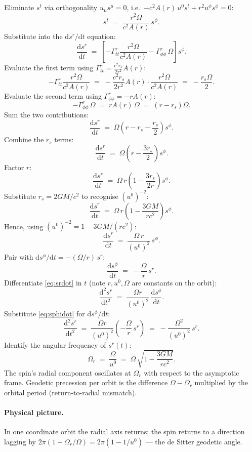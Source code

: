 \documentclass[11pt]{article}
\newcommand{\de}{\mathrm{d}}
\begin{document}
Eliminate $s^t$ via orthogonality $u_\mu s^\mu = 0$, i.e.\ $-c^2 A(r)\,u^0 s^t + r^2 u^\phi s^\phi = 0$:
\[
s^t \;=\; \frac{r^2\Omega}{c^2 A(r)}\,s^\phi.
\]
Substitute into the $\de s^r/\de t$ equation:
\[
\frac{\de s^r}{\de t} \;=\; \!\left[-\Gamma^{r}_{tt}\frac{r^2\Omega}{c^2 A(r)} - \Gamma^{r}_{\phi\phi}\,\Omega\right] s^\phi.
\]
Evaluate the first term using $\Gamma^r_{tt}=\tfrac{c^2 r_s}{2r^2}A(r)$:
\[
-\Gamma^{r}_{tt}\frac{r^2\Omega}{c^2 A(r)} \;=\; -\frac{c^2 r_s}{2 r^2}A(r)\cdot\frac{r^2\Omega}{c^2 A(r)} \;=\; -\frac{r_s\Omega}{2}.
\]
Evaluate the second term using $\Gamma^r_{\phi\phi}=-r A(r)$:
\[
-\Gamma^{r}_{\phi\phi}\,\Omega \;=\; r A(r)\,\Omega \;=\; (r-r_s)\Omega.
\]
Sum the two contributions:
\[
\frac{\de s^r}{\de t} \;=\; \Omega\!\left(r - r_s - \frac{r_s}{2}\right) s^\phi.
\]
Combine the $r_s$ terms:
\[
\frac{\de s^r}{\de t} \;=\; \Omega\!\left(r - \frac{3r_s}{2}\right) s^\phi.
\]
Factor $r$:
\[
\frac{\de s^r}{\de t} \;=\; \Omega\,r\!\left(1 - \frac{3 r_s}{2 r}\right) s^\phi.
\]
Substitute $r_s=2GM/c^2$ to recognise $(u^0)^{-2}$:
\[
\frac{\de s^r}{\de t} \;=\; \Omega\,r\!\left(1 - \frac{3GM}{rc^2}\right) s^\phi.
\]
Hence, using $(u^0)^{-2}=1-3GM/(rc^2)$:
\begin{equation}
\frac{\de s^r}{\de t} \;=\; \frac{\Omega\,r}{(u^0)^2}\,s^\phi.
\label{eq:srdot}
\end{equation}
Pair with $\de s^\phi/\de t = -(\Omega/r)\,s^r$:
\begin{equation}
\frac{\de s^\phi}{\de t} \;=\; -\frac{\Omega}{r}\,s^r.
\label{eq:sphidot}
\end{equation}
Differentiate \eqref{eq:srdot} in $t$ (note $r,u^0,\Omega$ are constants on the orbit):
\[
\frac{\de^2 s^r}{\de t^2} \;=\; \frac{\Omega r}{(u^0)^2}\,\frac{\de s^\phi}{\de t}.
\]
Substitute \eqref{eq:sphidot} for $\de s^\phi/\de t$:
\[
\frac{\de^2 s^r}{\de t^2} \;=\; \frac{\Omega r}{(u^0)^2}\!\left(-\frac{\Omega}{r}\,s^r\right) \;=\; -\frac{\Omega^2}{(u^0)^2}\,s^r.
\]
Identify the angular frequency of $s^r(t)$:
\begin{equation}
\boxed{\;\Omega_r \;=\; \frac{\Omega}{u^0} \;=\; \Omega\,\sqrt{1-\frac{3GM}{rc^2}}.\;}
\label{eq:Or}
\end{equation}
The spin's radial component oscillates at $\Omega_r$ with respect to the asymptotic frame. Geodetic precession per orbit is the difference $\Omega-\Omega_r$ multiplied by the orbital period (return-to-radial mismatch).

\paragraph{Physical picture.}
In one coordinate orbit the radial axis returns; the spin returns to a direction lagging by $2\pi(1-\Omega_r/\Omega)=2\pi(1-1/u^0)$ --- the de Sitter geodetic angle.
\end{document}
